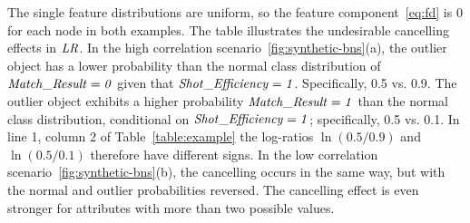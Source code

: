 \begin{table}[hbpt]
					\centering
						\end{table}
						
						
						The single feature distributions are uniform, so the feature component~\eqref{eq:fd} 
						is 0 for each node in both examples.
						The table illustrates the undesirable cancelling effects in $\it{LR}$. In the high correlation scenario~\ref{fig:synthetic-bns}(a), the outlier object has a lower probability than the normal class distribution of $\it{Match\_Result} = 0$ given that $\it{Shot\_Efficiency} = 1$. Specifically, 0.5 vs. 0.9. The outlier object exhibits a higher probability $\it{Match\_Result} = 1$ than the normal class distribution, conditional on $\it{Shot\_Efficiency} = 1$; specifically, 0.5 vs. 0.1. In line 1, column 2 of Table~\ref{table:example}  the log-ratios $\ln(0.5/0.9)$ and $\ln(0.5/0.1)$ therefore have different signs. In the low correlation scenario~\ref{fig:synthetic-bns}(b), the cancelling occurs in the same way, but with the normal and outlier probabilities reversed. 
						The cancelling effect is even stronger for attributes with more than two possible values.
						
